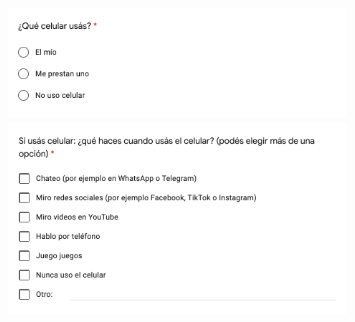 \begin{figure}[H]
    \includegraphics[width=0.8\textwidth]{imagenes_anexo/h.png}
    \includegraphics[width=0.8\textwidth]{imagenes_anexo/i.png}
\end{figure}
\enlargethispage{5\baselineskip}
